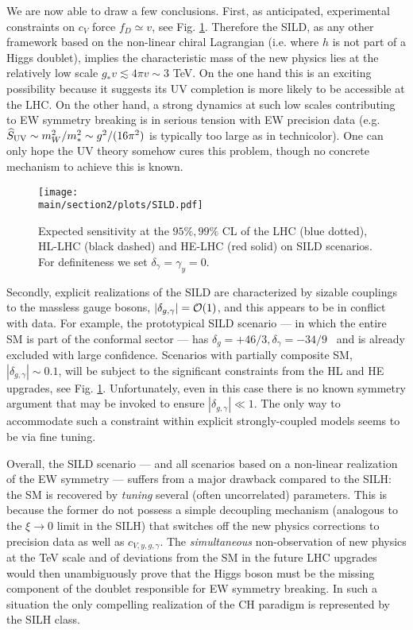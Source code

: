 We are now able to draw a few conclusions. First, as anticipated, experimental constraints on $c_V$ force $f_D\simeq v$, see Fig. \ref{SILD}. Therefore the SILD, as any other framework based on the non-linear chiral Lagrangian (i.e. where $h$ is not part of a Higgs doublet), implies the characteristic mass of the new physics lies at the relatively low scale $g_*v\lesssim4\pi v\sim3$ TeV. On the one hand this is an exciting possibility because it suggests its UV completion is more likely to be accessible at the LHC. On the other hand, a strong dynamics at such low scales contributing to EW symmetry breaking is in serious tension with EW precision data (e.g. $\widehat S_{\rm UV}\sim m_W^2/m_*^2\sim g^2/(16\pi^2)$ is typically too large as in technicolor). One can only hope the UV theory somehow cures this problem, though no concrete mechanism to achieve this is known.


\begin{figure}[t]
\begin{center}
\texttt{[image: \\main/section2/plots/SILD.pdf]}
\caption{Expected sensitivity at the $95\%, 99\%$ CL of the LHC (blue dotted), HL-LHC (black dashed) and HE-LHC (red solid) on SILD scenarios. For definiteness we set $\delta_\gamma=\gamma_y=0$.
}\label{SILD}
\end{center}
\end{figure}


Secondly, explicit realizations of the SILD are characterized by sizable couplings to the massless gauge bosons, $|\delta_{g,\gamma}|={\cal O}(1)$, and this appears to be in conflict with data. For example, the prototypical SILD scenario --- in which the entire SM is part of the conformal sector --- has $\delta_{g}=+46/3, \delta_\gamma=-34/9$~\cite{Goldberger:2008zz} and is already excluded with large confidence. Scenarios with partially composite SM, $|\delta_{g,\gamma}|\sim0.1$, will be subject to the significant constraints from the HL and HE upgrades, see Fig. \ref{SILD}. Unfortunately, even in this case there is no known symmetry argument that may be invoked to ensure $|\delta_{g,\gamma}|\ll1$. The only way to accommodate such a constraint within explicit strongly-coupled models seems to be via fine tuning.





Overall, the SILD scenario --- and all scenarios based on a non-linear realization of the EW symmetry --- suffers from a major drawback compared to the SILH: the SM is recovered by {\emph{tuning}} several (often uncorrelated) parameters. This is because the former do not possess a simple decoupling mechanism (analogous to the $\xi\to0$ limit in the SILH) that switches off the new physics corrections to precision data as well as $c_{V,y,g,\gamma}$. The {\emph{simultaneous}} non-observation of new physics at the TeV scale and of deviations from the SM in the future LHC upgrades would then unambiguously prove that the Higgs boson must be the missing component of the doublet responsible for EW symmetry breaking. In such a situation the only compelling realization of the CH paradigm is represented by the SILH class.




